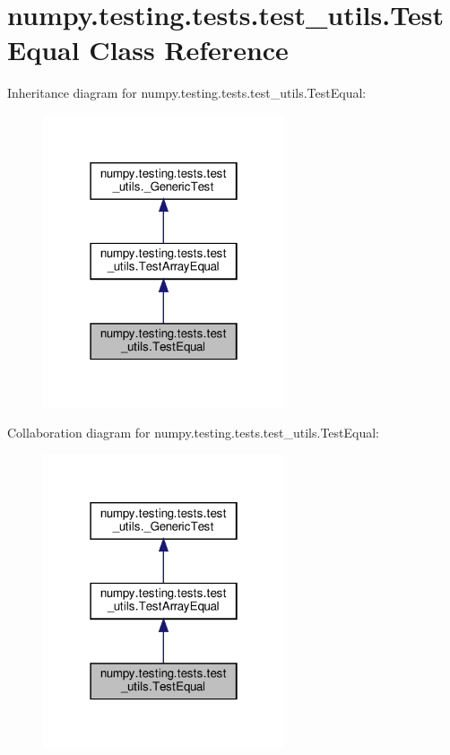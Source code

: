 \hypertarget{classnumpy_1_1testing_1_1tests_1_1test__utils_1_1TestEqual}{}\section{numpy.\+testing.\+tests.\+test\+\_\+utils.\+Test\+Equal Class Reference}
\label{classnumpy_1_1testing_1_1tests_1_1test__utils_1_1TestEqual}


Inheritance diagram for numpy.\+testing.\+tests.\+test\+\_\+utils.\+Test\+Equal\+:
\nopagebreak
\begin{figure}[H]
\begin{center}
\leavevmode
\includegraphics[width=202pt]{classnumpy_1_1testing_1_1tests_1_1test__utils_1_1TestEqual__inherit__graph}
\end{center}
\end{figure}


Collaboration diagram for numpy.\+testing.\+tests.\+test\+\_\+utils.\+Test\+Equal\+:
\nopagebreak
\begin{figure}[H]
\begin{center}
\leavevmode
\includegraphics[width=202pt]{classnumpy_1_1testing_1_1tests_1_1test__utils_1_1TestEqual__coll__graph}
\end{center}
\end{figure}

